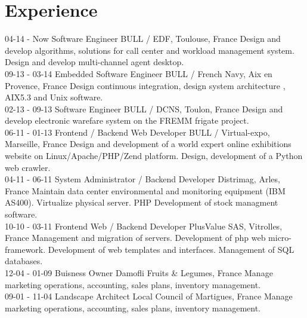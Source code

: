 \documentclass[]{friggeri-cv}
\begin{document}
\section{Experience}
\begin{entrylist}
  \entry
    {04-14 - Now}
    {Software Engineer}
    {BULL / EDF, Toulouse, France}
    {Design and develop algorithms, solutions for call center and workload management system. Design and develop multi-channel agent desktop.\\}
  \entry
    {09-13 - 03-14}
    {Embedded Software Engineer}
    {BULL / French Navy, Aix en Provence, France}
    {Design continuous integration, design system architecture , AIX5.3 and Unix software.\\}
    \entry
    {02-13 - 09-13}
    {Software Engineer}
    {BULL / DCNS, Toulon, France}
    {Design and develop electronic warefare system on the FREMM frigate project.\\}
    \entry
    {06-11 - 01-13}
    {Frontend / Backend Web Developer}
    {BULL / Virtual-expo, Marseille, France}
    {Design and development of a world expert online exhibitions website on Linux/Apache/PHP/Zend platform. Design, development of a Python web crawler.\\}
    \entry
    {04-11 - 06-11}
    {System Administrator / Backend Developer}
    {Distrimag, Arles, France}
    {Maintain data center environmental and monitoring equipment (IBM AS400). Virtualize physical server. PHP Development of stock managment software.\\}
    \entry
    {10-10 - 03-11}
    {Frontend Web / Backend Developer}
    {PlusValue SAS, Vitrolles, France}
    {Management and migration of servers. Development of php web micro-framework. Development of web templates and interfaces. Management of SQL databases.\\}
    \entry
    {12-04 - 01-09}
    {Buisness Owner}
    {Damofli Fruits \& Legumes, France}
    {Manage marketing operations, accounting, sales plans, inventory management.\\}
    \entry
    {09-01 - 11-04}
    {Landscape Architect}
    {Local Council of Martigues, France}
    {Manage marketing operations, accounting, sales plans, inventory management.}
\end{entrylist}

\newpage
\end{document}
